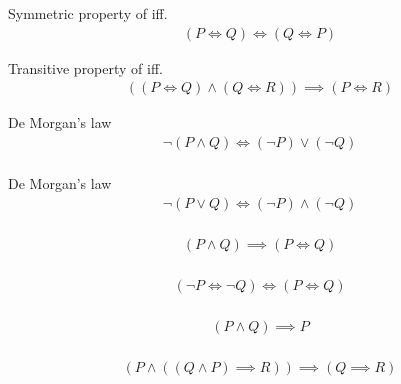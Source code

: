 \begin{prop}
\label{Proposition:iff_symmetric}
Symmetric property of iff.
\begin{align*}
(P \iff Q) \iff (Q \iff P)
\end{align*}
\end{prop}

\begin{prop}
\label{Proposition:iff_Transitive}
Transitive property of iff.
\begin{align*}
((P \iff Q) \land (Q \iff R)) \implies (P \iff R)
\end{align*}
\end{prop}

\begin{prop}
\label{Proposition:De_Morgan_1}
De Morgan's law
\begin{align*}
\lnot (P \land Q) \iff (\lnot P) \lor (\lnot Q) \\
\end{align*}
\end{prop}

\begin{prop}
\label{Proposition:De_Morgan_2}
De Morgan's law
\begin{align*}
\lnot (P \lor Q) \iff (\lnot P) \land (\lnot Q) \\
\end{align*}
\end{prop}

\begin{prop}
\label{Proposition:land_implies_iff}
\begin{align*}
(P \land Q) \implies  (P \iff Q) \\
\end{align*}
\end{prop}

\begin{prop}
\label{Proposition:iff_contrapositive}
\begin{align*}
(\lnot P \iff \lnot Q) \iff (P \iff Q) \\
\end{align*}
\end{prop}

\begin{prop}
\label{Proposition:land_omit}
\begin{align*}
(P \land Q) \implies P \\
\end{align*}
\end{prop}

\begin{lemma}
\label{Lemma:uniqueness}
\begin{align*}
(P \land ((Q \land P) \implies R)) \implies (Q \implies R) \\
\end{align*}
\end{lemma}